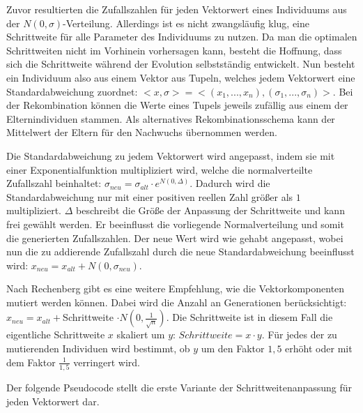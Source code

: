 Zuvor resultierten die Zufallszahlen für jeden Vektorwert eines Individuums aus der $N(0, \sigma)$-Verteilung. Allerdings ist es nicht zwangsläufig klug, eine Schrittweite für alle Parameter des Individuums zu nutzen. Da man die optimalen Schrittweiten nicht im Vorhinein vorhersagen kann, besteht die Hoffnung, dass sich die Schrittweite während der Evolution selbstständig entwickelt. Nun besteht ein Individuum also aus einem Vektor aus Tupeln, welches jedem Vektorwert eine Standardabweichung zuordnet: $<x, \sigma> = <(x_1,...,x_n), (\sigma_1,...,\sigma_n)>$. Bei der Rekombination können die Werte eines Tupels jeweils zufällig aus einem der Elternindividuen stammen. Als alternatives Rekombinationsschema kann der Mittelwert der Eltern für den Nachwuchs übernommen werden.

Die Standardabweichung zu jedem Vektorwert wird angepasst, indem sie mit einer Exponentialfunktion multipliziert wird, welche die normalverteilte Zufallszahl beinhaltet: $\sigma_{neu} = \sigma_{alt} \cdot e^{N(0, \Delta)}$. Dadurch wird die Standardabweichung nur mit einer positiven reellen Zahl größer als $1$ multipliziert. $\Delta$ beschreibt die Größe der Anpassung der Schrittweite und kann frei gewählt werden. Er beeinflusst die vorliegende Normalverteilung und somit die generierten Zufallszahlen. Der neue Wert wird wie gehabt angepasst, wobei nun die zu addierende Zufallszahl durch die neue Standardabweichung beeinflusst wird: $x_{neu} = x_{alt} + N(0, \sigma_{neu})$.

Nach Rechenberg gibt es eine weitere Empfehlung, wie die Vektorkomponenten mutiert werden können. Dabei wird die Anzahl an Generationen berücksichtigt: $x_{neu} = x_{alt} + $Schrittweite $\cdot N(0, \frac{1}{\sqrt{n}})$. Die Schrittweite ist in diesem Fall die eigentliche Schrittweite $x$ skaliert um $y$: $Schrittweite = x \cdot y$. Für jedes der zu mutierenden Individuen wird bestimmt, ob $y$ um den Faktor $1,5$ erhöht oder mit dem Faktor $\frac{1}{1,5}$ verringert wird.

Der folgende Pseudocode stellt die erste Variante der Schrittweitenanpassung für jeden Vektorwert dar.

